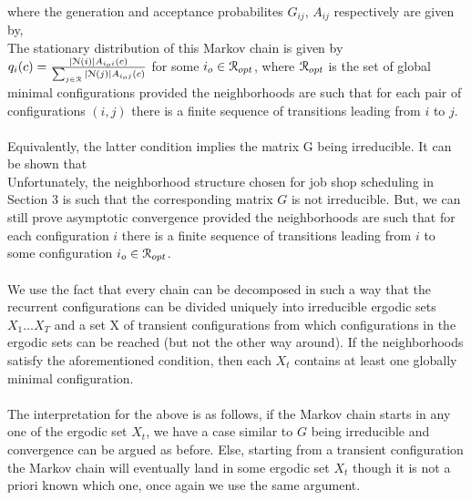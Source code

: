 \documentclass[letterpaper,english,10pt]{article}
\begin{document}
where the generation and acceptance probabilites $G_{ij}$, $A_{ij}$ respectively are given by,
\\
The stationary distribution of this Markov chain is given\cite{ref2} by $q_i(c) = \frac{|\mathcal{N}(i)|A_{i_oi}(c)}{\sum_{j \in \mathcal{R}}|\mathcal{N}(j)|A_{i_oj}(c)}$ for some $i_o \in \mathcal{R}_{opt}$, where $\mathcal{R}_{opt}$ is the set of global minimal configurations provided the neighborhoods are such that for each pair of configurations $(i,j)$ there is a finite sequence of transitions leading from $i$ to $j$.\\
\\
Equivalently, the latter condition implies the matrix G being irreducible. It can be shown that 
\\
Unfortunately, the neighborhood structure chosen for job shop scheduling in Section 3 is such that the corresponding matrix $G$ is not irreducible. But, we can still prove asymptotic convergence provided the neighborhoods are such that for each configuration $i$ there is a finite sequence of transitions leading from $i$ to some configuration $i_o \in \mathcal{R}_{opt}$.\\
\\
We use the fact that every chain can be decomposed in such a way that the recurrent configurations can be divided uniquely into irreducible ergodic sets $X_1 \ldots X_T$ and a set X of transient configurations from which configurations in the ergodic sets can be reached (but not the other way around). If the neighborhoods satisfy the aforementioned condition, then each $X_t$ contains at least one globally minimal configuration.\\
\\
The interpretation for the above is as follows, if the Markov chain starts in any one of the ergodic set $X_t$, we have a case similar to $G$ being irreducible and convergence can be argued as before. Else, starting from a transient configuration the Markov chain will eventually land in some ergodic set $X_t$ though it is not a priori known which one, once again we use the same argument.   
\end{document}
